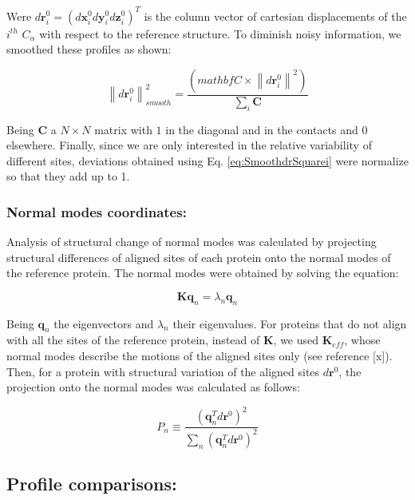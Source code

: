 \documentclass{article}
\begin{document}
\begin{multicols}{2}
{{Were $d\mathbf{r}^{0}_{i}=(d\mathbf{x}^{0}_{i}d\mathbf{y}^{0}_{i}d\mathbf{z}^{0}_{i})^{T}$ is the column vector of cartesian displacements of the $i^{th}$ $C_{\alpha}$ with respect to the reference structure. 
To diminish noisy information, we smoothed these profiles as shown:

\begin{equation} \label{eq:SmoothdrSquarei}
\left\|d\mathbf{r}^{0}_{i}\right\|^{2}_{smooth} = \frac{(mathbf{C} \times \left\|d\mathbf{r}^{0}_{i}\right\|^{2})}{\sum_{i} \mathbf{C}}

\end{equation}

Being $\mathbf{C}$ a $N \times N$ matrix with $1$ in the diagonal and in the contacts and $0$ elsewhere. 
Finally, since we are only interested in the relative variability of different sites, deviations obtained using Eq. \ref{eq:SmoothdrSquarei} were normalize so that they add up to 1.

\subsubsection*{Normal modes coordinates:}
Analysis of structural change of normal modes was calculated by projecting structural differences of aligned sites of each protein onto the normal modes of the reference protein. The normal modes were obtained by solving the equation:
  
\begin{equation}
\mathbf{K}\mathbf{q}_{n} = \lambda_{n}\mathbf{q}_{n} 
\end{equation}

Being $\mathbf{q}_{n}$ the eigenvectors and  $\lambda_{n}$ their eigenvalues. For proteins that do not align with all the sites of the reference protein, instead of $\mathbf{K}$, we used $\mathbf{K}_{eff}$, whose normal modes describe the motions of the aligned sites only (see reference [x]).
Then, for a protein with structural variation of the aligned sites $d\mathbf{r}^{0}$, the projection onto the normal modes was calculated as follows:

\begin{equation}
P_{n} \equiv \frac{(\mathbf{q}^{T}_{n}d\mathbf{r}^{0})^2}{\sum_{n}(\mathbf{q}^{T}_{n}d\mathbf{r}^{0})^2}
\end{equation}

\subsection*{ Profile comparisons:}

}}
\end{multicols}
\end{document}
